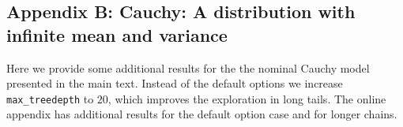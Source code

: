 \documentclass[american,]{article}
\let\oldparagraph\paragraph
\renewcommand{\paragraph}[1]{\oldparagraph{#1}\mbox{}}
\begin{document}
\hypertarget{AppendixE}{%
\subsection*{Appendix B: Cauchy: A distribution with infinite mean and
variance}\label{AppendixE}}

Here we provide some additional results for the the nominal Cauchy
model presented in the main text. Instead of the default options we
increase \texttt{max\_treedepth} to \(20\), which improves the
exploration in long tails. The online appendix has additional results
for the default option case and for longer chains.









\end{document}
